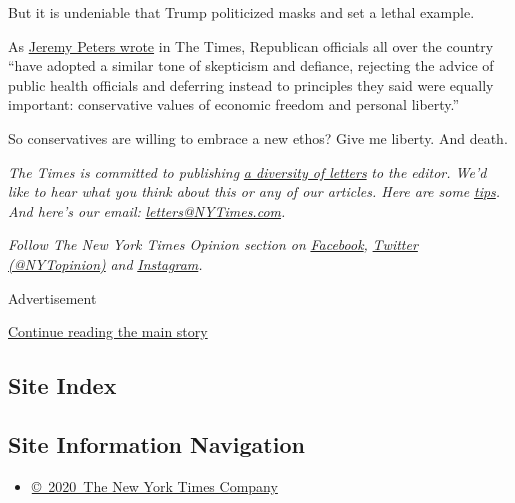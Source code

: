 But it is undeniable that Trump politicized masks and set a lethal
example.

As
\href{https://www.nytimes3xbfgragh.onion/2020/07/30/us/politics/herman-cain-gop-coronavirus.html}{Jeremy
Peters wrote} in The Times, Republican officials all over the country
``have adopted a similar tone of skepticism and defiance, rejecting the
advice of public health officials and deferring instead to principles
they said were equally important: conservative values of economic
freedom and personal liberty.''

So conservatives are willing to embrace a new ethos? Give me liberty.
And death.

\emph{The Times is committed to publishing}
\href{https://www.nytimes3xbfgragh.onion/2019/01/31/opinion/letters/letters-to-editor-new-york-times-women.html}{\emph{a
diversity of letters}} \emph{to the editor. We'd like to hear what you
think about this or any of our articles. Here are some}
\href{https://help.nytimes3xbfgragh.onion/hc/en-us/articles/115014925288-How-to-submit-a-letter-to-the-editor}{\emph{tips}}\emph{.
And here's our email:}
\href{mailto:letters@NYTimes.com}{\emph{letters@NYTimes.com}}\emph{.}

\emph{Follow The New York Times Opinion section on}
\href{https://www.facebookcorewwwi.onion/nytopinion}{\emph{Facebook}}\emph{,}
\href{http://twitter.com/NYTOpinion}{\emph{Twitter (@NYTopinion)}}
\emph{and}
\href{https://www.instagram.com/nytopinion/}{\emph{Instagram}}\emph{.}

Advertisement

\protect\hyperlink{after-bottom}{Continue reading the main story}

\hypertarget{site-index}{%
\subsection{Site Index}\label{site-index}}

\hypertarget{site-information-navigation}{%
\subsection{Site Information
Navigation}\label{site-information-navigation}}

\begin{itemize}
\tightlist
\item
  \href{https://help.nytimes3xbfgragh.onion/hc/en-us/articles/115014792127-Copyright-notice}{©~2020~The
  New York Times Company}
\end{itemize}

